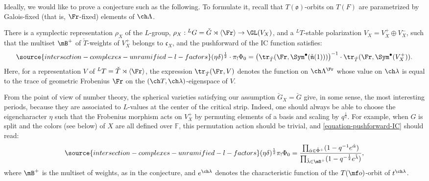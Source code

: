 Ideally, we would like to prove a conjecture such as the following. To formulate it, recall that $T(\mathfrak o)$-orbits on $T(F)$ are parametrized by Galois-fixed (that is, $\Fr$-fixed) elements of $\ch\Lambda$.

\begin{conj}
\notready
\label{conjecture-pushforward-IC}
There is a symplectic representation $\rho_X$ of the $L$-group, $\rho_X: {^LG}=\check G \rtimes \left<\Fr\right> \to \GL(V_X)$, and a ${^LT}$-stable polarization $V_X=V_X^+\oplus V_X^-$, such that the multiset $\mB^+$ of $\check T$-weights of $V_X^+$ belongs to $\mathfrak c_X$, and the pushforward of the IC function satisfies:
 \begin{equation}
 \label{equation-pushforward-IC}
\source{intersection-complexes-unramified-l-factors}
  (\eta\delta)^\frac{1}{2} \cdot \pi_! \Phi_0 = \left(\tr_{\check T}(\Fr, \Sym^\bullet (\check{\mathfrak n}(1)))\right)^{-1} \cdot \tr_{\check T}(\Fr, \Sym^\bullet (V_X^+)).
 \end{equation}
 Here, for a representation $V$ of ${^LT}=\check T\rtimes\left<\Fr\right>$, the expression $\tr_{\check T}(\Fr,V)$ denotes the function on $\ch\Lambda^{\Fr}$ whose value on $\ch\lambda$ is equal to the trace of geometric Frobenius $\Fr$ on the $(\ch T, \ch\lambda)$-eigenspace of $V$.
\end{conj}

From the point of view of number theory, the spherical varieties satisfying our assumption $\check G_X=\check G$ give, in some sense, the most interesting periods, because they are associated to $L$-values at the center of the critical strip. Indeed, one should always be able to choose the eigencharacter $\eta$ such that the Frobenius morphism acts on $V_X^+$ by permuting elements of a basis and scaling by $q^\frac{1}{2}$.
For example, when $G$ is split and the colors (see below) of $X$ are all defined over $\mathbb F$, this permutation action should be trivial, and \eqref{equation-pushforward-IC} should read:
\begin{equation}\label{equation-pushforward-IC-expl}
\source{intersection-complexes-unramified-l-factors}
(\eta\delta)^\frac{1}{2} \pi_! \Phi_0 = \frac{\prod_{\check\alpha\in\check\Phi^+} (1-q^{-1} e^{\check\alpha})}{\prod_{\check\lambda \in \mB^+} (1-q^{-\frac{1}{2}} e^{\check\lambda})},
\end{equation}
where $\mB^+$ is the multiset of weights, as in the conjecture, and $e^{\ch\lambda}$ denotes the characteristic function of the $T(\mf o)$-orbit of $t^{\ch\lambda}$.

